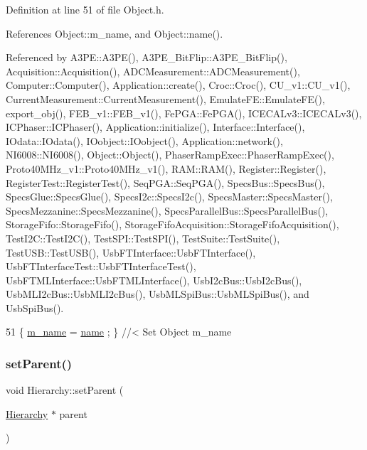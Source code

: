 Definition at line 51 of file Object.\+h.



References Object\+::m\+\_\+name, and Object\+::name().



Referenced by A3\+P\+E\+::\+A3\+P\+E(), A3\+P\+E\+\_\+\+Bit\+Flip\+::\+A3\+P\+E\+\_\+\+Bit\+Flip(), Acquisition\+::\+Acquisition(), A\+D\+C\+Measurement\+::\+A\+D\+C\+Measurement(), Computer\+::\+Computer(), Application\+::create(), Croc\+::\+Croc(), C\+U\+\_\+v1\+::\+C\+U\+\_\+v1(), Current\+Measurement\+::\+Current\+Measurement(), Emulate\+F\+E\+::\+Emulate\+F\+E(), export\+\_\+obj(), F\+E\+B\+\_\+v1\+::\+F\+E\+B\+\_\+v1(), Fe\+P\+G\+A\+::\+Fe\+P\+G\+A(), I\+C\+E\+C\+A\+Lv3\+::\+I\+C\+E\+C\+A\+Lv3(), I\+C\+Phaser\+::\+I\+C\+Phaser(), Application\+::initialize(), Interface\+::\+Interface(), I\+Odata\+::\+I\+Odata(), I\+Oobject\+::\+I\+Oobject(), Application\+::network(), N\+I6008\+::\+N\+I6008(), Object\+::\+Object(), Phaser\+Ramp\+Exec\+::\+Phaser\+Ramp\+Exec(), Proto40\+M\+Hz\+\_\+v1\+::\+Proto40\+M\+Hz\+\_\+v1(), R\+A\+M\+::\+R\+A\+M(), Register\+::\+Register(), Register\+Test\+::\+Register\+Test(), Seq\+P\+G\+A\+::\+Seq\+P\+G\+A(), Specs\+Bus\+::\+Specs\+Bus(), Specs\+Glue\+::\+Specs\+Glue(), Specs\+I2c\+::\+Specs\+I2c(), Specs\+Master\+::\+Specs\+Master(), Specs\+Mezzanine\+::\+Specs\+Mezzanine(), Specs\+Parallel\+Bus\+::\+Specs\+Parallel\+Bus(), Storage\+Fifo\+::\+Storage\+Fifo(), Storage\+Fifo\+Acquisition\+::\+Storage\+Fifo\+Acquisition(), Test\+I2\+C\+::\+Test\+I2\+C(), Test\+S\+P\+I\+::\+Test\+S\+P\+I(), Test\+Suite\+::\+Test\+Suite(), Test\+U\+S\+B\+::\+Test\+U\+S\+B(), Usb\+F\+T\+Interface\+::\+Usb\+F\+T\+Interface(), Usb\+F\+T\+Interface\+Test\+::\+Usb\+F\+T\+Interface\+Test(), Usb\+F\+T\+M\+L\+Interface\+::\+Usb\+F\+T\+M\+L\+Interface(), Usb\+I2c\+Bus\+::\+Usb\+I2c\+Bus(), Usb\+M\+L\+I2c\+Bus\+::\+Usb\+M\+L\+I2c\+Bus(), Usb\+M\+L\+Spi\+Bus\+::\+Usb\+M\+L\+Spi\+Bus(), and Usb\+Spi\+Bus().


\begin{DoxyCode}
51 \{ \hyperlink{classObject_a8b83c95c705d2c3ba0d081fe1710f48d}{m\_name}  = \hyperlink{classObject_a300f4c05dd468c7bb8b3c968868443c1}{name}  ; \} \textcolor{comment}{//< Set Object m\_name}
\end{DoxyCode}
\mbox{\label{classHierarchy_a585ad1aeec16077a0e532ab8b4fc557b}} 
\subsubsection{\texorpdfstring{set\+Parent()}{setParent()}}
{\footnotesize\ttfamily void Hierarchy\+::set\+Parent (\begin{DoxyParamCaption}\item[{\hyperlink{classHierarchy}{Hierarchy} $\ast$}]{parent }\end{DoxyParamCaption})\hspace{0.3cm}{\ttfamily [inherited]}}



